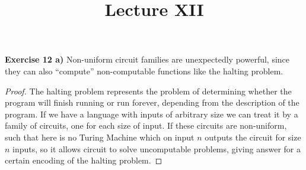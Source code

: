 \documentclass[a4paper]{article}
\title{\vspace{-2cm}Lecture XII\vspace{-2cm}}
\date{}
\begin{document}
\maketitle
\noindent \textbf{Exercise 12 a)}  Non-uniform circuit families are unexpectedly powerful, since they can also “compute” non-computable functions like the halting problem.
\begin{proof}
The halting problem represents the problem of determining whether the program will finish running or run forever, depending from the description of the program. If we have a language with inputs of arbitrary size we can treat it by a family of circuits, one for each size of input. If these circuits are non-uniform, such that here is no Turing Machine which on input $n$ outputs the circuit for size $n$ inputs, so it allows circuit to solve uncomputable problems, giving answer for a certain encoding of the halting problem.
\end{proof}
\end{document}
